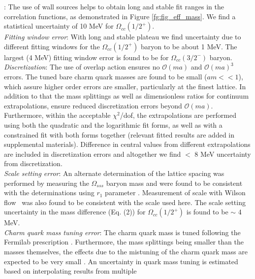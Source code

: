 \documentclass[showkeys,aps,twocolumn,showpacs,preprintnumbers,amsmath,amssymb,prl,letterpaper,floatfix,nofootinbib,superscriptaddress,]{revtex4-1}
\newcommand\fgn[1]{Figure \ref{fg:#1}}
\begin{document}
{{:  The use of wall sources helps to obtain long and stable fit ranges in the correlation functions, 
as demonstrated in \fgn{fig_eff_mass}. We find a statistical uncertainty of 10 MeV for $\Omega_{cc}(1/2^{+})$.\\
{\it Fitting window error}: With long and stable plateau we find uncertainty due to different fitting windows for the 
$\Omega_{cc}(1/2^{+})$ baryon to be about 1 MeV. The largest (4 MeV) fitting window error is found to be for $\Omega_{cc}(3/2^{-})$ baryon. \\
{\it Discretization}:
The use of overlap action ensures no $\mathcal{O}(ma)$ and $\mathcal{O}(ma)^3$ errors. The tuned bare charm quark masses are found to be small ($am<<1$), which assure higher order errors are smaller, particularly at the finest lattice. In addition to that the mass
splittings as well as dimensionless ratios for continuum extrapolations,
ensure reduced discretization errors beyond $\mathcal{O}(ma)$.
 Furthermore, within the acceptable $\chi^{2}$/dof, the
extrapolations are performed using both the quadratic and the logarithmic fit forms, as well as with a constrained fit with both forms together (relevant fitted results are added in supplemental materials). Difference in central values from different
extrapolations are included in discretization errors and altogether we find $<$ 8 MeV uncertainty from discretization.
\\
{\it Scale setting error}: An alternate determination of the lattice spacing was performed \cite{Basak:2013oya} by measuring the $\Omega_{sss}$
baryon mass and were found to be consistent with the determinations using $r_1$ parameter \cite{Bazavov:2012xda}. Measurement of scale with Wilson flow~\cite{Bazavov:2015yea} was also found to be consistent with the scale used here.
The scale setting uncertainty in the mass difference (Eq. (2)) for $\Omega_{cc}(1/2^+)$ is found to be $\sim$ 4 MeV. \\
{\it Charm quark mass tuning error}: The charm quark mass is tuned following the Fermilab prescription \cite{ElKhadra:1996mp}.
Furthermore, the mass splittings being smaller than the masses themselves, the effects due to the mistuning of the charm quark mass are expected to be very small  \cite{Mathur:2002ce,Dowdall:2012ab,Brown:2014ena}. An uncertainty in quark mass tuning is estimated based on interpolating results from multiple 
}}
\end{document}
